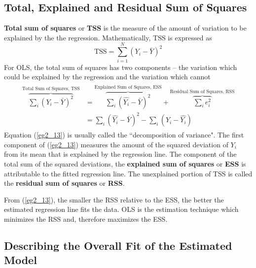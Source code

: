 \documentclass[11pt]{article}
\begin{document}
\subsection{Total, Explained and Residual Sum of Squares}
\textbf{Total sum of squares} or \textbf{TSS} is the measure of the amount of variation to be explained by the the regression. Mathematically, TSS is expressed as
\begin{equation}
\text{TSS} = \sum^N_{i=1}(Y_i-\bar{Y})^2 \label{eg2_12}
\end{equation}
For OLS, the total sum of squares has two components -- the variation which could be explained by the regression and the variation which cannot
\begin{align}
\label{eg2_13}
\begin{split}
\overbrace{\sum_i (Y_i - \bar{Y})^2}^{\text{Total
 Sum of Squares, TSS}} &= \overbrace{\sum_i (\hat{Y_i} - \bar{Y})^2}^{\text{Explained Sum of Squares, ESS}} +
\overbrace{\sum_i e_i^2}^{\text{Residual Sum of Squares, RSS}}\\&=\sum_i(\hat{Y_i}-\bar{Y})^2 - \sum_i (Y_i-\hat{Y_i})
\end{split}
\end{align}
Equation (\ref{eg2_13}) is usually called the ``decomposition of variance". The first component of (\ref{eg2_13}) measures the amount of the squared deviation of $Y_i$ from its mean that is explained by the regression line. The component of the total sum of the squared deviations, the \textbf{explained sum of squares} or \textbf{ESS} is attributable to the fitted regression line. The unexplained portion of TSS is called the \textbf{residual sum of squares} or \textbf{RSS}.

From (\ref{eg2_13}), the smaller the RSS relative to the ESS, the better the estimated regression line fits the data. OLS is the estimation technique which minimizes the RSS and, therefore maximizes the ESS.
\subsection{Describing the Overall Fit of the Estimated Model}
\end{document}
